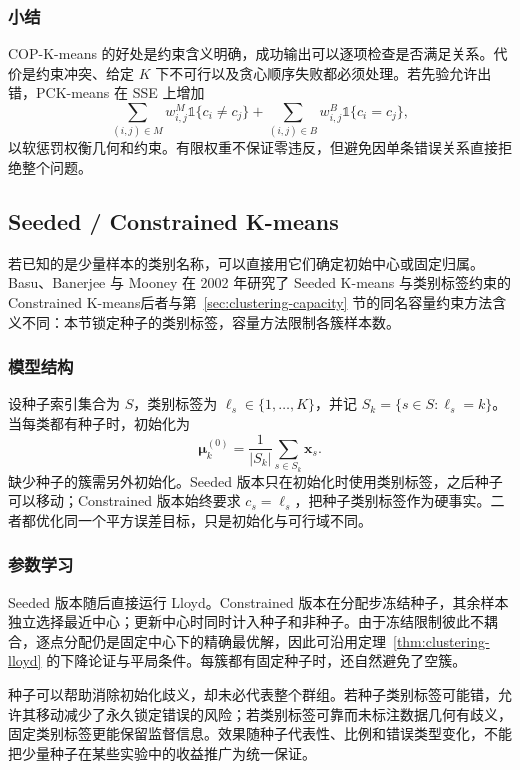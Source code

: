 \subsubsection{小结}

COP-K-means 的好处是约束含义明确，成功输出可以逐项检查是否满足关系。代价是约束冲突、给定 $K$ 下不可行以及贪心顺序失败都必须处理。若先验允许出错，PCK-means 在 SSE 上增加
\[
 \sum_{(i,j)\in M}w_{i,j}^{M}\mathbb{1}\{c_i\ne c_j\}
 +\sum_{(i,j)\in B}w_{i,j}^{B}\mathbb{1}\{c_i=c_j\},
\]
以软惩罚权衡几何和约束。有限权重不保证零违反，但避免因单条错误关系直接拒绝整个问题。

\subsection{Seeded / Constrained K-means}
\label{sec:clustering-seeded}

若已知的是少量样本的类别名称，可以直接用它们确定初始中心或固定归属。Basu、Banerjee 与 Mooney 在 2002 年研究了 Seeded K-means 与类别标签约束的 Constrained K-means后者与第~\ref{sec:clustering-capacity} 节的同名容量约束方法含义不同：本节锁定种子的类别标签，容量方法限制各簇样本数。

\subsubsection{模型结构}

设种子索引集合为 $S$，类别标签为 $\ell_s\in\{1,\ldots,K\}$，并记 $S_k=\{s\in S:\ell_s=k\}$。当每类都有种子时，初始化为
\[
 \bm{\mu}_k^{(0)}
 =\frac{1}{|S_k|}\sum_{s\in S_k}\bm{x}_s.
\]
缺少种子的簇需另外初始化。Seeded 版本只在初始化时使用类别标签，之后种子可以移动；Constrained 版本始终要求 $c_s=\ell_s$，把种子类别标签作为硬事实。二者都优化同一个平方误差目标，只是初始化与可行域不同。

\subsubsection{参数学习}

Seeded 版本随后直接运行 Lloyd。Constrained 版本在分配步冻结种子，其余样本独立选择最近中心；更新中心时同时计入种子和非种子。由于冻结限制彼此不耦合，逐点分配仍是固定中心下的精确最优解，因此可沿用定理~\ref{thm:clustering-lloyd} 的下降论证与平局条件。每簇都有固定种子时，还自然避免了空簇。

种子可以帮助消除初始化歧义，却未必代表整个群组。若种子类别标签可能错，允许其移动减少了永久锁定错误的风险；若类别标签可靠而未标注数据几何有歧义，固定类别标签更能保留监督信息。效果随种子代表性、比例和错误类型变化，不能把少量种子在某些实验中的收益推广为统一保证。

